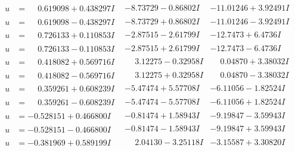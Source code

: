 \documentclass[1p]{elsarticle_modified}
\theoremstyle{definition}
\begin{document}
$$\begin{array}{c|c|c}
\begin{aligned}
u &= \phantom{-}0.619098 + 0.438297 I\end{aligned}
 & -8.73729 - 0.86802 I & -11.01246 + 3.92491 I \\ \hline\begin{aligned}
u &= \phantom{-}0.619098 - 0.438297 I\end{aligned}
 & -8.73729 + 0.86802 I & -11.01246 - 3.92491 I \\ \hline\begin{aligned}
u &= \phantom{-}0.726133 + 0.110853 I\end{aligned}
 & -2.87515 - 2.61799 I & -12.7473 + 6.4736 I \\ \hline\begin{aligned}
u &= \phantom{-}0.726133 - 0.110853 I\end{aligned}
 & -2.87515 + 2.61799 I & -12.7473 - 6.4736 I \\ \hline\begin{aligned}
u &= \phantom{-}0.418082 + 0.569716 I\end{aligned}
 & \phantom{-}3.12275 - 0.32958 I & \phantom{-}0.04870 + 3.38032 I \\ \hline\begin{aligned}
u &= \phantom{-}0.418082 - 0.569716 I\end{aligned}
 & \phantom{-}3.12275 + 0.32958 I & \phantom{-}0.04870 - 3.38032 I \\ \hline\begin{aligned}
u &= \phantom{-}0.359261 + 0.608239 I\end{aligned}
 & -5.47474 + 5.57708 I & -6.11056 - 1.82524 I \\ \hline\begin{aligned}
u &= \phantom{-}0.359261 - 0.608239 I\end{aligned}
 & -5.47474 - 5.57708 I & -6.11056 + 1.82524 I \\ \hline\begin{aligned}
u &= -0.528151 + 0.466800 I\end{aligned}
 & -0.81474 + 1.58943 I & -9.19847 - 3.59943 I \\ \hline\begin{aligned}
u &= -0.528151 - 0.466800 I\end{aligned}
 & -0.81474 - 1.58943 I & -9.19847 + 3.59943 I \\ \hline\begin{aligned}
u &= -0.381969 + 0.589199 I\end{aligned}
 & \phantom{-}2.04130 - 3.25118 I & -3.15587 + 3.30820 I \\ \hline\begin{aligned}

\end{aligned}
\end{array}$$
\end{document}
